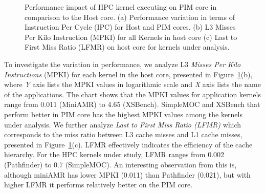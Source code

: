 \begin{figure}[!t]
  
   \vspace{-.05in}
   \caption{ Performance impact of HPC kernel executing on PIM core in comparison to the Host core. (a) Performance variation in terms of Instruction Per Cycle (IPC) for Host and PIM cores. (b) L3 Misses Per Kilo Instruction (MPKI) for all Kernels in host core (c) Last to First Miss Ratio (LFMR) on host core for kernels under analysis.}   
 \vspace{-.3in}
 \label{fig:expr:pim}
 \vspace{-1em}
\end{figure}

To investigate the variation in performance, we analyze L3 \textit{Misses Per Kilo Instructions} (MPKI) for each kernel in the host core, presented in Figure~\ref{fig:expr:pim}(b), where \textit{Y} axis lists the MPKI values in logarithmic scale and \textit{X} axis lists the name of the applications. The chart shows that the MPKI values for application kernels range from 0.011 (MiniAMR) to 4.65 (XSBench). SimpleMOC and XSBench that perform better in PIM core has the highest MPKI values among the kernels under analysis. We further analyze \textit{Last to First Miss Ratio (LFMR)} which corresponds to the miss ratio between L3 cache misses and L1 cache misses, presented in  Figure~\ref{fig:expr:pim}(c). LFMR effectively indicates the efficiency of the cache hierarchy. For the HPC kernels under study, LFMR ranges from 0.002 (Pathfinder) to 0.7 (SimpleMOC). An interesting observation from this is, although miniAMR has lower MPKI (0.011) than Pathfinder (0.021), but with higher LFMR it performs relatively better on the PIM core.   




